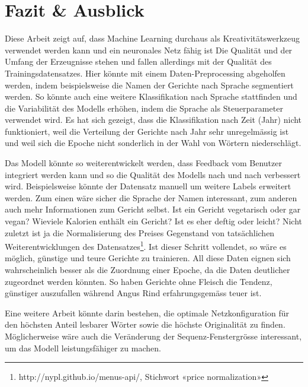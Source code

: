 \chapter{Fazit \& Ausblick}
\label{ch:conclusions}

Diese Arbeit zeigt auf, dass Machine Learning durchaus als Kreativitätswerkzeug verwendet werden kann und ein
neuronales Netz fähig ist
Die Qualität und der Umfang der Erzeugnisse stehen und fallen allerdings mit der Qualität des Trainingsdatensatzes.
Hier könnte mit einem Daten-Preprocessing abgeholfen werden, indem beispielsweise die Namen der Gerichte nach
Sprache segmentiert werden.
So könnte auch eine weitere Klassifikation nach Sprache stattfinden und die Variabilität des Modells erhöhen, indem
die Sprache als Steuerparameter verwendet wird.
Es hat sich gezeigt, dass die Klassifikation nach Zeit (Jahr) nicht funktioniert, weil die Verteilung der Gerichte nach Jahr sehr unregelmässig ist und
weil sich die Epoche nicht sonderlich in der Wahl von Wörtern niederschlägt.

Das Modell könnte so weiterentwickelt werden, dass Feedback vom Benutzer integriert werden kann und so die Qualität des Modells nach und nach verbessert wird.
Beispielsweise könnte der Datensatz manuell um weitere Labels erweitert werden.
Zum einen wäre sicher die Sprache der Namen interessant, zum anderen auch mehr Informationen zum Gericht selbst.
Ist ein Gericht vegetarisch oder gar vegan?
Wieviele Kalorien enthält ein Gericht?
Ist es eher deftig oder leicht?
Nicht zuletzt ist ja die Normalisierung des Preises Gegenstand von tatsächlichen Weiterentwicklungen des Datensatzes\footnote{http://nypl.github.io/menus-api/, Stichwort «price normalization»}.
Ist dieser Schritt vollendet, so wäre es möglich, günstige und teure Gerichte zu trainieren.
All diese Daten eignen sich wahrscheinlich besser als die Zuordnung einer Epoche, da die Daten deutlicher zugeordnet werden könnten.
So haben Gerichte ohne Fleisch die Tendenz, günstiger auszufallen während Angus Rind erfahrungsgemäss teuer ist.

Eine weitere Arbeit könnte darin bestehen, die optimale Netzkonfiguration für den höchsten Anteil lesbarer Wörter sowie die
höchste Originalität zu finden.
Möglicherweise wäre auch die Veränderung der Sequenz-Fenstergrösse interessant, um das Modell leistungsfähiger zu machen.
